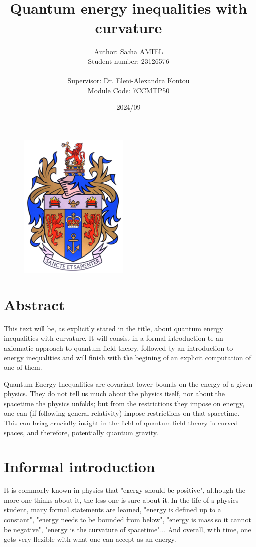 \documentclass[a4paper,11pt]{article}
\title{Quantum energy inequalities with curvature}
\author{Author: Sacha AMIEL \\
Student number: 23126576\\
\\ Supervisor: Dr. Eleni-Alexandra Kontou \\ Module Code: 7CCMTP50}
\date{2024/09}
\numberwithin{equation}{section}
\theoremstyle{definition}
\begin{document}
\clearpage\maketitle
\thispagestyle{empty}
\begin{figure}[H]
    \centering
    \vspace{100mm}
    \includegraphics[width=0.2\columnwidth]{Template/kcl_logo.png}
\end{figure}

\newpage
\section*{Abstract}
This \color{red} text \color{black} will be, as explicitly stated in the title, about quantum energy inequalities with curvature. It will consist in a formal introduction to an axiomatic approach to quantum field theory, followed by an introduction to energy inequalities and will finish with the begining of an explicit computation of one of them.

Quantum Energy Inequalities are covariant lower bounds on the energy of a given physics. They do not tell us much about the physics itself, nor about the spacetime the physics unfolds; but from the restrictions they impose on energy, one can (if following general relativity) impose restrictions on that spacetime. This can bring crucially insight in the field of quantum field theory in curved spaces, and therefore, potentially quantum gravity.

\section*{Informal introduction}
It is commonly known in physics that "energy should be positive", although the more one thinks about it, the less one is sure about it. In the life of a physics student, many formal statements are learned, "energy is defined up to a constant", "energy needs to be bounded from below", "energy is mass so it cannot be negative", "energy is the curvature of spacetime"... And overall, with time, one gets very flexible with what one can accept as an energy.
\end{document}
